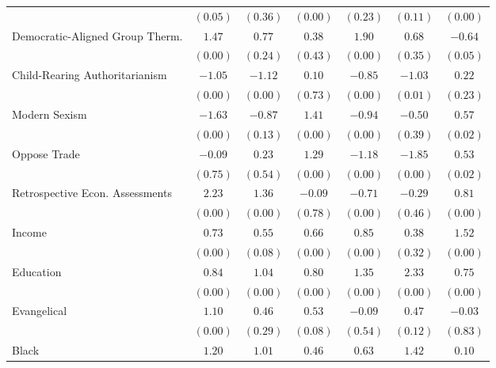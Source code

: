 \begin{table}[!htbp]
\begin{adjustbox}{width=0.8\textwidth,center}
\begin{threeparttable}
\begin{tabular}{lccc|ccc}
                                & $(0.05)$  & $(0.36)$  & $(0.00)$  & $(0.23)$  & $(0.11)$  & $(0.00)$  \\
Democratic-Aligned Group Therm. & $1.47$    & $0.77$    & $0.38$    & $1.90$    & $0.68$    & $-0.64$   \\
                                & $(0.00)$  & $(0.24)$  & $(0.43)$  & $(0.00)$  & $(0.35)$  & $(0.05)$  \\
Child-Rearing Authoritarianism  & $-1.05$   & $-1.12$   & $0.10$    & $-0.85$   & $-1.03$   & $0.22$    \\
                                & $(0.00)$  & $(0.00)$  & $(0.73)$  & $(0.00)$  & $(0.01)$  & $(0.23)$  \\
Modern Sexism                   & $-1.63$   & $-0.87$   & $1.41$    & $-0.94$   & $-0.50$   & $0.57$    \\
                                & $(0.00)$  & $(0.13)$  & $(0.00)$  & $(0.00)$  & $(0.39)$  & $(0.02)$  \\
Oppose Trade                    & $-0.09$   & $0.23$    & $1.29$    & $-1.18$   & $-1.85$   & $0.53$    \\
                                & $(0.75)$  & $(0.54)$  & $(0.00)$  & $(0.00)$  & $(0.00)$  & $(0.02)$  \\
Retrospective Econ. Assessments & $2.23$    & $1.36$    & $-0.09$   & $-0.71$   & $-0.29$   & $0.81$    \\
                                & $(0.00)$  & $(0.00)$  & $(0.78)$  & $(0.00)$  & $(0.46)$  & $(0.00)$  \\
Income                          & $0.73$    & $0.55$    & $0.66$    & $0.85$    & $0.38$    & $1.52$    \\
                                & $(0.00)$  & $(0.08)$  & $(0.00)$  & $(0.00)$  & $(0.32)$  & $(0.00)$  \\
Education                       & $0.84$    & $1.04$    & $0.80$    & $1.35$    & $2.33$    & $0.75$    \\
                                & $(0.00)$  & $(0.00)$  & $(0.00)$  & $(0.00)$  & $(0.00)$  & $(0.00)$  \\
Evangelical                     & $1.10$    & $0.46$    & $0.53$    & $-0.09$   & $0.47$    & $-0.03$   \\
                                & $(0.00)$  & $(0.29)$  & $(0.08)$  & $(0.54)$  & $(0.12)$  & $(0.83)$  \\
Black                           & $1.20$    & $1.01$    & $0.46$    & $0.63$    & $1.42$    & $0.10$    \\

\end{tabular}
\end{threeparttable}
\end{adjustbox}
\end{table}
